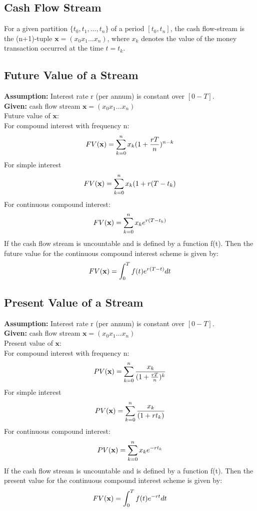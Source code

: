 \documentclass{report}
\begin{document}
\subsection{Cash Flow Stream}
For a given partition $\{t_0, t_1, \dots, t_n\}$ of a period $[t_0, t_n]$, the cash flow-stream is the (n+1)-tuple $\textbf{x} = (x_0 x_1 \dots x_n)$, where $x_k$ denotes the value of the money transaction occurred at the time $t=t_k$.

\subsection{Future Value of a Stream}
\textbf{Assumption:} Interest rate r (per annum) is constant over $[0-T]$.\\
\textbf{Given:} cash flow stream $\textbf{x} = (x_0 x_1 \dots x_n)$\\
Future value of $\textbf{x}$:\\
For compound interest with frequency n:
\begin{equation}
    FV({\bf x}) = \sum_{k=0}^nx_k(1+\frac{rT}{n})^{n-k}
\end{equation}
For simple interest
\begin{equation}
    FV({\bf x}) = \sum_{k=0}^nx_k(1+r(T-t_k)
\end{equation}
For continuous compound interest:
\begin{equation}
    FV({\bf x}) = \sum_{k=0}^nx_ke^{r(T-t_k)}
\end{equation}
If the cash flow stream is uncountable and is defined by a function f(t). Then the future value for the continuous compound interest scheme is given by:
\begin{equation}
    FV({\bf x}) = \int_0^Tf(t)e^{r(T-t)}dt
\end{equation}

\subsection{Present Value of a Stream}
\textbf{Assumption:} Interest rate r (per annum) is constant over $[0-T]$.\\
\textbf{Given:} cash flow stream $\textbf{x} = (x_0 x_1 \dots x_n)$\\
Present value of $\textbf{x}$:\\

For compound interest with frequency n:
\begin{equation}
    PV({\bf x}) = \sum_{k=0}^n\frac{x_k}{(1+\frac{rT}{n})^{k}}
\end{equation}
For simple interest
\begin{equation}
    PV({\bf x}) = \sum_{k=0}^n\frac{x_k}{(1+rt_k)}
\end{equation}
For continuous compound interest:
\begin{equation}
    PV({\bf x}) = \sum_{k=0}^nx_ke^{-rt_k}
\end{equation}
If the cash flow stream is uncountable and is defined by a function f(t). Then the present value for the continuous compound interest scheme is given by:
\begin{equation}
    FV({\bf x}) = \int_0^Tf(t)e^{-rt}dt
\end{equation}
\end{document}
